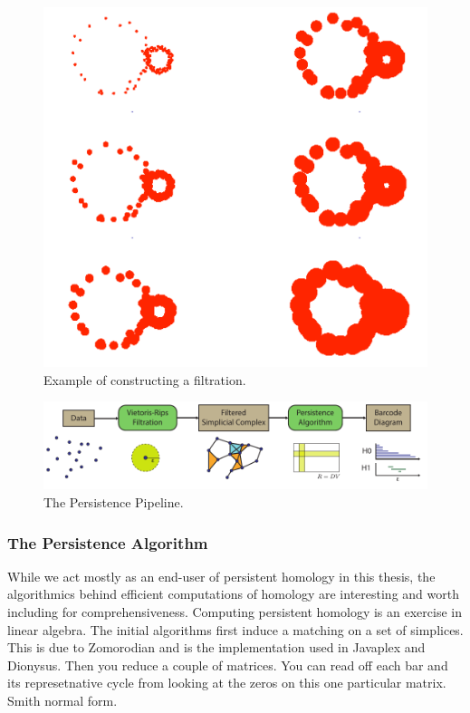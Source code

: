 \begin{figure}
\centering
\includegraphics[]{./fig/LESNICK_ExpandingBalls.pdf}
\caption[A filtration]{Example of constructing a filtration.}
\label{background:fig:exanding balls}
\end{figure}

\begin{figure}
\centering
\includegraphics[]{./fig/persistence_pipeline.pdf}
\caption[The Persistence Pipeline]{The Persistence Pipeline.}
\label{background:fig:persistence_pipeline}
\end{figure}

\subsubsection{The Persistence Algorithm}
\label{subsubsec:ph_algorithm}

While we act mostly as an end-user of persistent homology in this thesis, the algorithmics behind efficient computations of homology are interesting and worth including for comprehensiveness.
Computing persistent homology is an exercise in linear algebra.
The initial algorithms first induce a matching on a set of simplices.
This is due to Zomorodian and is the implementation used in Javaplex and Dionysus.
Then you reduce a couple of matrices.
You can read off each bar and its represetnative cycle from looking at the zeros on this one particular matrix.
Smith normal form.

